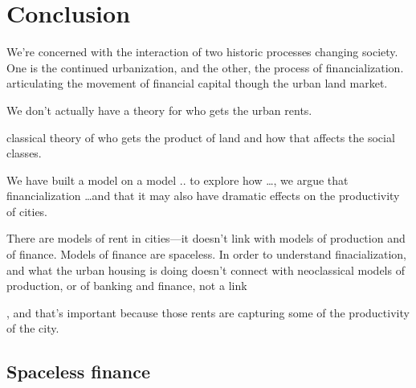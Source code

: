 \chapter{Conclusion} \label{chapter-conclusions}


We're concerned with the interaction of two historic processes changing society. One is the continued urbanization, and the other, the process of financialization. 
articulating the movement of financial capital though the urban land market. 

We don't actually have a theory for who gets the urban rents. 


 classical theory of who gets the product of land and how that affects the social classes.

We have built a model  on a model ..  to explore how \dots , we argue that financialization \dots and that it may also have dramatic effects on the productivity of cities.

There are models of rent in cities---it doesn't link with models of production and of finance.  Models of finance are spaceless.  In order to understand finacialization, and what the urban housing is doing doesn't connect with neoclassical models of production, or of banking and finance, not a link


, and that's important because those rents are capturing some of the productivity of the city. 

\section{Spaceless finance}

